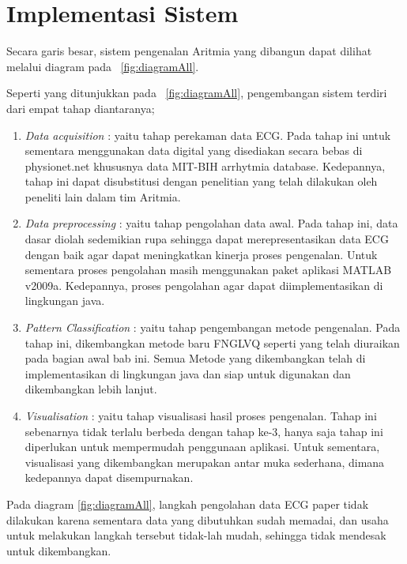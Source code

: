 \section{Implementasi Sistem}
Secara garis besar, sistem pengenalan Aritmia yang dibangun dapat dilihat
melalui diagram pada \pic~\ref{fig:diagramAll}. 


Seperti yang ditunjukkan pada \pic~\ref{fig:diagramAll}, pengembangan sistem
terdiri dari empat tahap diantaranya;
\begin{enumerate}
  \item \emph{Data acquisition} : yaitu tahap perekaman data ECG. Pada tahap
  ini untuk sementara menggunakan data digital yang disediakan secara bebas di
  physionet.net khususnya data MIT-BIH arrhytmia database. Kedepannya, tahap ini dapat
  disubstitusi dengan penelitian yang telah dilakukan oleh peneliti lain dalam tim Aritmia.
  \item \emph{Data preprocessing} : yaitu tahap pengolahan data awal. Pada tahap
  ini, data dasar diolah sedemikian rupa sehingga dapat merepresentasikan data
  ECG dengan baik agar dapat meningkatkan kinerja proses pengenalan. Untuk
  sementara proses pengolahan masih menggunakan paket aplikasi MATLAB v2009a.
  Kedepannya, proses pengolahan agar dapat diimplementasikan di lingkungan java.
  \item \emph{Pattern Classification} : yaitu tahap pengembangan metode
  pengenalan. Pada tahap ini, dikembangkan metode baru FNGLVQ seperti yang
  telah diuraikan pada bagian awal bab ini. Semua Metode yang dikembangkan telah
  di implementasikan di lingkungan java dan siap untuk digunakan dan
  dikembangkan lebih lanjut.
  \item \emph{Visualisation} : yaitu tahap visualisasi hasil proses pengenalan.
  Tahap ini sebenarnya tidak terlalu berbeda dengan tahap ke-3, hanya saja tahap
  ini diperlukan untuk mempermudah penggunaan aplikasi. Untuk sementara,
  visualisasi yang dikembangkan merupakan antar muka sederhana, dimana
  kedepannya dapat disempurnakan.
\end{enumerate}

Pada diagram \ref{fig:diagramAll}, langkah pengolahan data ECG paper tidak
dilakukan karena sementara data yang dibutuhkan sudah memadai, dan usaha untuk
melakukan langkah tersebut tidak-lah mudah, sehingga tidak  mendesak untuk
dikembangkan.

